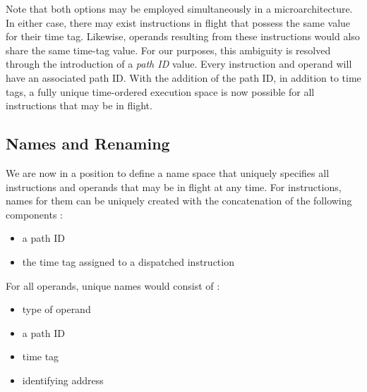 \documentclass[10pt,twocolumn]{article}
\begin{document}
Note that both options may be employed simultaneously in a 
microarchitecture.
In either case, there may exist instructions in flight
that possess the same value for their time tag.  
Likewise,
operands resulting from these instructions would also share
the same time-tag value.
For our purposes, this ambiguity is resolved through the
introduction of a \textit{path ID} value.
Every instruction and operand will have an associated path ID.
With the addition of the path ID, in addition to time tags,
a fully unique time-ordered execution space is now possible for
all instructions that may be in flight.
%
\vspace{-0.25in}
\subsection{Names and Renaming}
\vspace{-0.15in}
%
We are now in a position to define a name space that
uniquely specifies all instructions and operands that
may be in flight at any time.
For instructions, names for them can be uniquely created
with the concatenation of the following components :
%
\begin{itemize}
\vspace{-0.15in}
\item{a path ID}
\vspace{-0.15in}
\item{the time tag assigned to a dispatched instruction}
\vspace{-0.15in}
\end{itemize}   
%
For all operands, unique names would consist of :
%
\begin{itemize}
\vspace{-0.15in}
\item{type of operand}
\vspace{-0.15in}
\item{a path ID}
\vspace{-0.15in}
\item{time tag}
\vspace{-0.15in}
\item{identifying address}
\vspace{-0.15in}
\end{itemize}   
%
\end{document}
